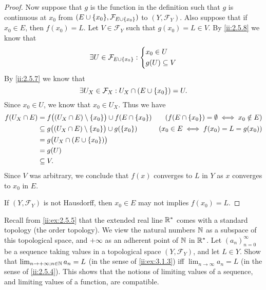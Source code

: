 \begin{proof}
  Now suppose that \(g\) is the function in the definition such that \(g\) is continuous at \(x_0\) from \((E \cup \set{x_0}, \mathcal{F}_{E \cup \set{x_0}})\) to \((Y, \mathcal{F}_Y)\).
  Also suppose that if \(x_0 \in E\), then \(f(x_0) = L\).
  Let \(V \in \mathcal{F}_Y\) such that \(g(x_0) = L \in V\).
  By \cref{ii:2.5.8} we know that
  \[
    \exists U \in \mathcal{F}_{E \cup \left\lbrace x_0\right\rbrace} : \begin{dcases}
      x_0 \in U \\
      g(U) \subseteq V
    \end{dcases}
  \]
  By \cref{ii:2.5.7} we know that
  \[
    \exists U_X \in \mathcal{F}_X : U_X \cap (E \cup \left\lbrace x_0\right\rbrace) = U.
  \]
  Since \(x_0 \in U\), we know that \(x_0 \in U_X\).
  Thus we have
  \begin{align*}
    f(U_X \cap E) & = f\big((U_X \cap E) \setminus \set{x_0}\big) \cup f(E \cap \set{x_0})  & (f(E \cap \set{x_0}) = \emptyset \iff x_0 \notin E) \\
                  & \subseteq g\big((U_X \cap E) \setminus \set{x_0}\big) \cup g(\set{x_0}) & (x_0 \in E \iff f(x_0) = L = g(x_0))                \\
                  & = g\big(U_X \cap (E \cup \set{x_0})\big)                                                                                      \\
                  & = g(U)                                                                                                                        \\
                  & \subseteq V.
  \end{align*}
  Since \(V\) was arbitrary, we conclude that \(f(x)\) converges to \(L\) in \(Y\) as \(x\) converges to \(x_0\) in \(E\).

  If \((Y, \mathcal{F}_Y)\) is not Hausdorff, then \(x_0 \in E\) may not implies \(f(x_0) = L\).
\end{proof}

\begin{ex}\label{ii:ex:3.1.4}
  Recall from \cref{ii:ex:2.5.5} that the extended real line \(\mathbb{R}^*\) comes with a standard topology (the order topology).
  We view the natural numbers \(\mathbb{N}\) as a subspace of this topological space, and \(+\infty\) as an adherent point of \(\mathbb{N}\) in \(\mathbb{R}^*\).
  Let \((a_n)_{n = 0}^\infty\) be a sequence taking values in a topological space \((Y, \mathcal{F}_Y)\), and let \(L \in Y\).
  Show that \(\lim_{n \to +\infty ; n \in \mathbb{N}} a_n = L\) (in the sense of \cref{ii:ex:3.1.3}) iff \(\lim_{n \to \infty} a_n = L\) (in the sense of \cref{ii:2.5.4}).
  This shows that the notions of limiting values of a sequence, and limiting values of a function, are compatible.
\end{ex}

